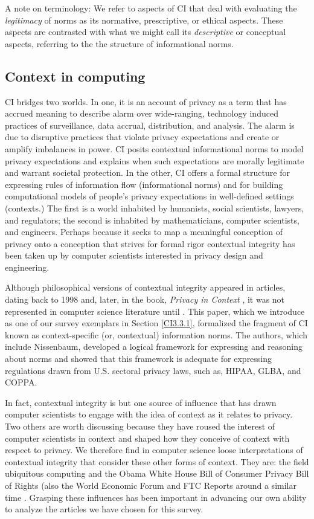 \documentclass[../thesis.tex]{subfiles}
\begin{document}
A note on terminology: We refer to aspects of CI that deal with
evaluating the \textit{legitimacy} of norms as its normative,
prescriptive, or ethical aspects. These aspects are contrasted with
what we might call its \textit{descriptive} or conceptual aspects,
referring to the the structure of informational norms.


\subsection{Context in computing}
\label{CI2.2}

CI bridges two worlds. In one, it is an account of
privacy as a term that has accrued meaning to describe alarm over
wide-ranging, technology induced practices of surveillance, data
accrual, distribution, and analysis. The alarm is due to disruptive
practices that violate privacy expectations and create or amplify
imbalances in power. CI posits contextual informational norms to model
privacy expectations and explains when such expectations are morally
legitimate and warrant societal protection. In the other, CI offers a
formal structure for expressing rules of information flow
(informational norms) and for building computational models of
people's privacy expectations in well-defined settings
(contexts.) The first is a world inhabited by humanists, social
scientists, lawyers, and regulators; the second is inhabited by
mathematicians, computer scientists, and engineers. Perhaps because it
seeks to map a meaningful conception of privacy onto a conception
that strives for formal rigor contextual integrity has been taken up by
computer scientists interested in privacy design and engineering. 

Although philosophical versions of contextual
integrity appeared in articles, dating back to 1998
\citep{nissenbaum1998protecting}
and, later, in the book, \textit{Privacy in Context} \cite{nissenbaum2009privacy},
it was not represented in
computer science literature until \citet{barth06sp}. This paper,
which we introduce as one of our survey exemplars in
Section \ref{CI3.3.1},
formalized the fragment of CI known as context-specific (or,
contextual) information norms. The authors, which include Nissenbaum,
developed a logical framework for expressing and reasoning about norms
and showed that this framework is adequate for expressing regulations
drawn from U.S. sectoral privacy laws, such as, HIPAA, GLBA, and COPPA.

In fact, contextual integrity is but one source of influence that has
drawn computer scientists to engage with the idea of context as it
relates to privacy. Two others are worth discussing because they have
roused the interest of computer scientists in context and shaped how
they conceive of context with respect to privacy. We therefore find in
computer science loose interpretations of contextual integrity that
consider these other forms of context. They are: the field ubiquitous
computing and the Obama White House Bill of Consumer Privacy Bill of
Rights \cite{house2012consumer} (also the World Economic Forum and FTC
Reports around a similar time \citep{wef2012rethinking, federalprotecting}.
Grasping these influences has been important in advancing our own
ability to analyze the articles we have chosen for this survey.
\end{document}
